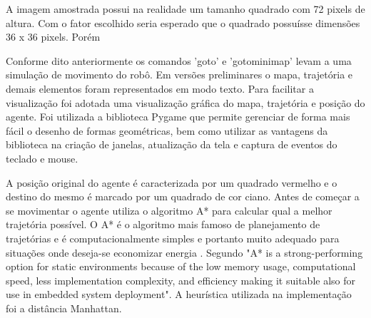 \documentclass[eq,capa]{texufpel}
\begin{document}



 

A imagem amostrada possui na realidade um tamanho quadrado com 72 pixels de altura. Com o fator escolhido seria esperado que o quadrado possuísse dimensões 36 x 36 pixels. Porém

Conforme dito anteriormente os comandos 'goto' e 'gotominimap' levam a uma simulação de movimento do robô. Em versões preliminares o mapa, trajetória e demais elementos foram representados em modo texto. Para facilitar a visualização foi adotada uma visualização gráfica do mapa, trajetória e posição do agente. Foi utilizada a biblioteca Pygame que permite gerenciar de forma mais fácil o desenho de formas geométricas, bem como utilizar as vantagens da biblioteca na criação de janelas, atualização da tela e captura de eventos do teclado e mouse.
 
A posição original do agente é caracterizada por um quadrado vermelho e o destino do mesmo é marcado por um quadrado de cor ciano. Antes de começar a se movimentar o agente utiliza o algoritmo A* para calcular qual a melhor trajetória possível. O A* é o algoritmo mais famoso de planejamento de trajetórias e é computacionalmente simples e portanto muito adequado para situações onde deseja-se economizar energia \cite{raj2022comprehensive}. Segundo \cite{2021surveypath} "A* is a strong-performing option for static environments because of the low memory usage, computational speed, less implementation complexity, and efficiency making it suitable also for use in embedded system deployment". A heurística utilizada na implementação foi a distância Manhattan. 
\end{document}
